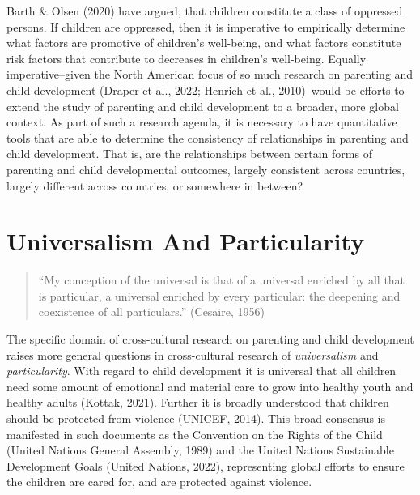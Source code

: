 \documentclass[
  letterpaper,
  DIV=11,
  numbers=noendperiod]{scrreprt}
\begin{document}
Barth \& Olsen (2020) have argued, that children constitute a class of
oppressed persons. If children are oppressed, then it is imperative to
empirically determine what factors are promotive of children's
well-being, and what factors constitute risk factors that contribute to
decreases in children's well-being. Equally imperative--given the North
American focus of so much research on parenting and child development
(Draper et al., 2022; Henrich et al., 2010)--would be efforts to extend
the study of parenting and child development to a broader, more global
context. As part of such a research agenda, it is necessary to have
quantitative tools that are able to determine the consistency of
relationships in parenting and child development. That is, are the
relationships between certain forms of parenting and child developmental
outcomes, largely consistent across countries, largely different across
countries, or somewhere in between?

\section{Universalism And
Particularity}\label{universalism-and-particularity}

\begin{quote}
``My conception of the universal is that of a universal enriched by all
that is particular, a universal enriched by every particular: the
deepening and coexistence of all particulars.'' (Cesaire, 1956)
\end{quote}

The specific domain of cross-cultural research on parenting and child
development raises more general questions in cross-cultural research of
\emph{universalism} and \emph{particularity}.  With
regard to child development it is universal that all children need some
amount of emotional and material care to grow into healthy youth and
healthy adults (Kottak, 2021). Further it is broadly understood that
children should be protected from violence (UNICEF, 2014). This broad
consensus is manifested in such documents as the Convention on the
Rights of the Child (United Nations General Assembly, 1989) and the
United Nations Sustainable Development Goals (United Nations, 2022),
representing global efforts to ensure the children are cared for, and
are protected against violence.
\end{document}
